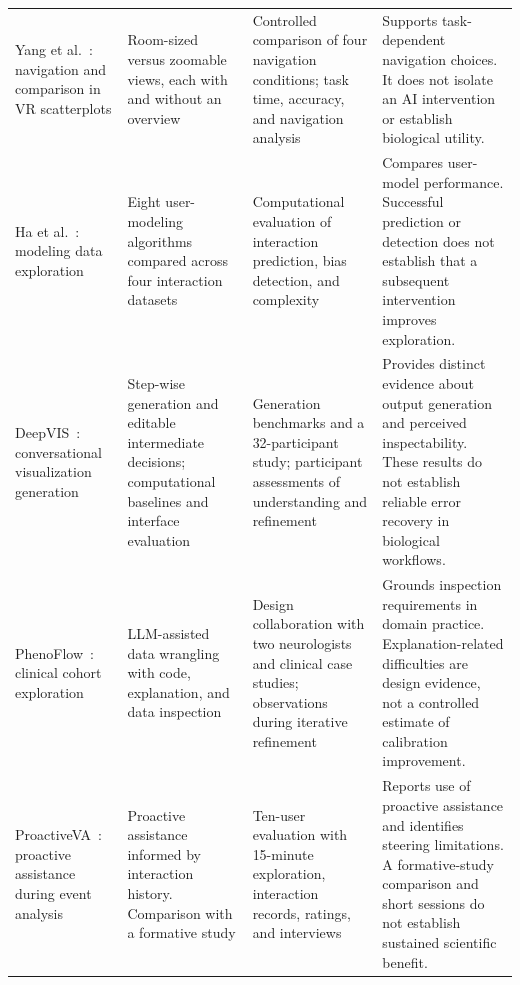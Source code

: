 \begin{table}[t]
\begin{tabular}{@{}>{\raggedright\arraybackslash}p{}>{\raggedright\arraybackslash}p{}>{\raggedright\arraybackslash}p{}>{\raggedright\arraybackslash}p{}@{}}
\addlinespace[3pt]

Yang et al.~\cite{EvalYang2021}: navigation and comparison in VR scatterplots & Room-sized versus zoomable views, each with and without an overview & Controlled comparison of four navigation conditions; task time, accuracy, and navigation analysis & Supports task-dependent navigation choices. It does not isolate an AI intervention or establish biological utility. \\

\addlinespace[3pt]

Ha et al.~\cite{EvalHa2023}: modeling data exploration & Eight user-modeling algorithms compared across four interaction datasets & Computational evaluation of interaction prediction, bias detection, and complexity & Compares user-model performance. Successful prediction or detection does not establish that a subsequent intervention improves exploration. \\

\addlinespace[3pt]

DeepVIS~\cite{EvalShuai2025}: conversational visualization generation & Step-wise generation and editable intermediate decisions; computational baselines and interface evaluation & Generation benchmarks and a 32-participant study; participant assessments of understanding and refinement & Provides distinct evidence about output generation and perceived inspectability. These results do not establish reliable error recovery in biological workflows. \\

\addlinespace[3pt]

PhenoFlow~\cite{EvalKim2025}: clinical cohort exploration & LLM-assisted data wrangling with code, explanation, and data inspection & Design collaboration with two neurologists and clinical case studies; observations during iterative refinement & Grounds inspection requirements in domain practice. Explanation-related difficulties are design evidence, not a controlled estimate of calibration improvement. \\

\addlinespace[3pt]

ProactiveVA~\cite{EvalZhao2025}: proactive assistance during event analysis & Proactive assistance informed by interaction history. Comparison with a formative study & Ten-user evaluation with 15-minute exploration, interaction records, ratings, and interviews & Reports use of proactive assistance and identifies steering limitations. A formative-study comparison and short sessions do not establish sustained scientific benefit. \\


\end{tabular}
\end{table}
